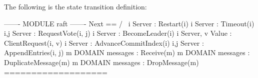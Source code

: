 \documentclass{report}
\begin{document}
The following is the state transition definition:

\begin{tla}
------- MODULE raft ------- 
Next == /\ \/ \E i \in Server : Restart(i)
           \/ \E i \in Server : Timeout(i)
           \/ \E i,j \in Server : RequestVote(i, j)
           \/ \E i \in Server : BecomeLeader(i)
           \/ \E i \in Server, v \in Value : ClientRequest(i, v)
           \/ \E i \in Server : AdvanceCommitIndex(i)
           \/ \E i,j \in Server : AppendEntries(i, j)
           \/ \E m \in DOMAIN messages : Receive(m)
           \/ \E m \in DOMAIN messages : DuplicateMessage(m)
           \/ \E m \in DOMAIN messages : DropMessage(m)
=================== 
\end{tla}
\begin{tlatex}
\@x{}\moduleLeftDash{}\moduleRightDash\@xx{}%
%
%
%
\@x{}\bottombar\@xx{}%
\end{tlatex}
\newline
\end{document}
